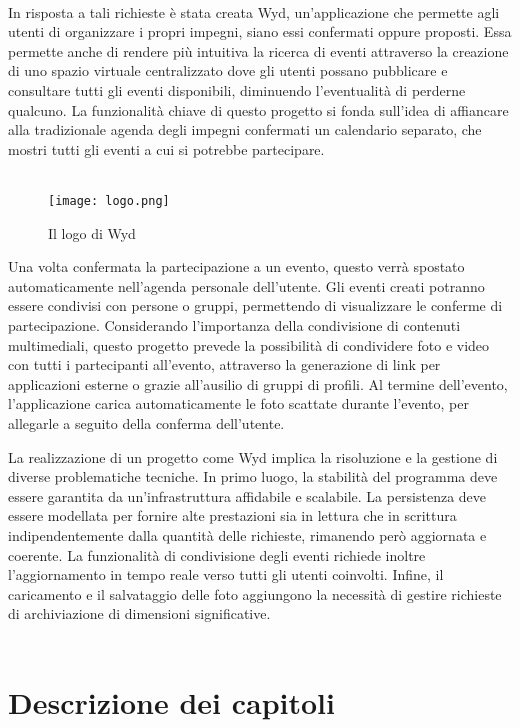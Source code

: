 \\
In risposta a tali richieste è stata creata Wyd, 
un'applicazione che permette agli utenti di organizzare i propri impegni, 
siano essi confermati oppure proposti. 
Essa permette anche di rendere più intuitiva la ricerca di eventi 
attraverso la creazione di uno spazio virtuale centralizzato 
dove gli utenti possano pubblicare e consultare tutti gli eventi disponibili,
diminuendo l’eventualità di perderne qualcuno.
La funzionalità chiave di questo progetto si fonda sull'idea di affiancare
alla tradizionale agenda degli impegni confermati un calendario separato, 
che mostri tutti gli eventi a cui si potrebbe partecipare. \\
\\
\begin{wrapfigure}{r}{0.4\textwidth}
    \centering
    \texttt{[image: logo.png]}
    \caption{Il logo di Wyd}
\end{wrapfigure}	
Una volta confermata la partecipazione a un evento, 
questo verrà spostato automaticamente nell'agenda personale dell'utente.
Gli eventi creati potranno essere condivisi con persone o gruppi, 
permettendo di visualizzare le conferme di partecipazione. 
Considerando l'importanza della condivisione di contenuti multimediali, 
questo progetto prevede la possibilità di condividere foto e video con tutti i partecipanti all'evento, 
attraverso la generazione di link per applicazioni esterne o grazie all'ausilio di gruppi di profili. 
Al termine dell'evento, l'applicazione carica automaticamente le foto scattate durante l'evento,
per allegarle a seguito della conferma dell'utente.



\clearpage
La realizzazione di un progetto come Wyd implica
la risoluzione e la gestione di diverse problematiche tecniche. 
In primo luogo, la stabilità del programma deve essere garantita 
da un'infrastruttura affidabile e scalabile. 
La persistenza deve essere modellata per fornire alte prestazioni sia in lettura che in scrittura 
indipendentemente dalla quantità delle richieste,
rimanendo però aggiornata e coerente.
La funzionalità di condivisione degli eventi richiede inoltre l'aggiornamento in tempo reale verso tutti gli utenti coinvolti.
Infine, il caricamento e il salvataggio delle foto aggiungono la necessità di gestire richieste di archiviazione di dimensioni significative.\\
\\
\section*{Descrizione dei capitoli}

